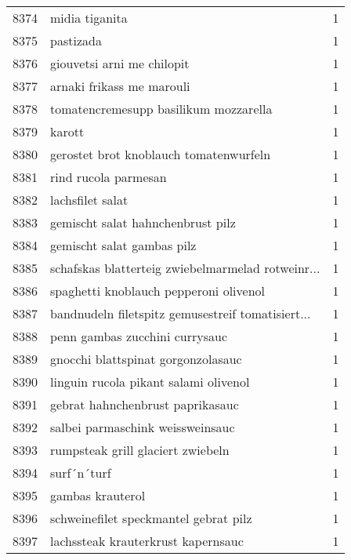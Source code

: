 \begin{tabular}{llr}
8374 &                                     midia tiganita &      1 \\
8375 &                                          pastizada &      1 \\
8376 &                         giouvetsi arni me chilopit &      1 \\
8377 &                          arnaki frikass me marouli &      1 \\
8378 &              tomatencremesupp basilikum mozzarella &      1 \\
8379 &                                             karott &      1 \\
8380 &             gerostet brot knoblauch tomatenwurfeln &      1 \\
8381 &                               rind rucola parmesan &      1 \\
8382 &                                   lachsfilet salat &      1 \\
8383 &                  gemischt salat hahnchenbrust pilz &      1 \\
8384 &                         gemischt salat gambas pilz &      1 \\
8385 &  schafskas blatterteig zwiebelmarmelad rotweinr... &      1 \\
8386 &             spaghetti knoblauch pepperoni olivenol &      1 \\
8387 &  bandnudeln filetspitz gemusestreif tomatisiert... &      1 \\
8388 &                     penn gambas zucchini currysauc &      1 \\
8389 &                 gnocchi blattspinat gorgonzolasauc &      1 \\
8390 &              linguin rucola pikant salami olivenol &      1 \\
8391 &                   gebrat hahnchenbrust paprikasauc &      1 \\
8392 &                   salbei parmaschink weissweinsauc &      1 \\
8393 &                  rumpsteak grill glaciert zwiebeln &      1 \\
8394 &                                        surf´n´turf &      1 \\
8395 &                                   gambas krauterol &      1 \\
8396 &              schweinefilet speckmantel gebrat pilz &      1 \\
8397 &                 lachssteak krauterkrust kapernsauc &      1 \\

\end{tabular}
